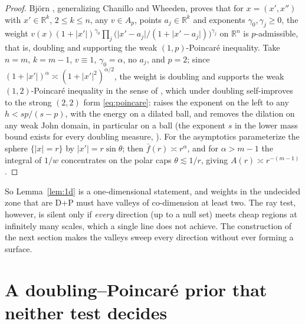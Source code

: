 \documentclass[11pt]{amsart}
\newcommand{\R}{\mathbb{R}}
\newcommand{\abs}[1]{\lvert #1\rvert}
\newcommand{\fbar}{\bar f}
\theoremstyle{plain}
\theoremstyle{definition}
\theoremstyle{remark}
\begin{document}
\begin{proof}
Bj\"orn \cite[Prop.~6]{bjorn2001}, generalizing Chanillo and Wheeden, proves
that for $x=(x',x'')$ with $x'\in\R^k$, $2\le k\le n$, any $v\in A_p$, points
$a_j\in\R^k$ and exponents $\gamma_0,\gamma_j\ge0$, the weight
$v(x)(1+\abs{x'})^{\gamma_0}\prod_j\bigl(\abs{x'-a_j}/(1+\abs{x'-a_j})\bigr)^{\gamma_j}$
on $\R^n$ is $p$-admissible, that is, doubling and supporting the weak
$(1,p)$-Poincar\'e inequality. Take $n=m$, $k=m-1$, $v\equiv1$,
$\gamma_0=\alpha$, no $a_j$, and $p=2$; since $(1+\abs{x'})^\alpha\asymp
(1+\abs{x'}^2)^{\alpha/2}$, the weight is doubling and supports the weak
$(1,2)$-Poincar\'e inequality in the sense of \cite[(5), p.~7]{hajlaszkoskela2000},
which under doubling self-improves to the strong $(2,2)$ form
\eqref{eq:poincare}: \cite[Thm.~5.1]{hajlaszkoskela2000} raises the exponent
on the left to any $h<sp/(s-p)$, with the energy on a dilated ball, and
\cite[Thm.~9.7]{hajlaszkoskela2000} removes the dilation on any weak John
domain, in particular on a ball (the exponent $s$ in the lower mass bound
exists for every doubling measure, \cite[Lemma~14.6]{hajlaszkoskela2000}). For the
asymptotics parameterize the sphere $\{\abs x=r\}$ by $\abs{x'}=r\sin\theta$;
then $\fbar(r)\asymp r^\alpha$, and for $\alpha>m-1$ the integral of $1/w$
concentrates on the polar caps $\theta\lesssim1/r$, giving
$A(r)\asymp r^{-(m-1)}$.
\end{proof}

So Lemma~\ref{lem:1d} is a one-dimensional statement, and weights in the
undecided zone that are D+P must have valleys of co-dimension at least two. The
ray test, however, is silent only if \emph{every} direction (up to a null set)
meets cheap regions at infinitely many scales, which a single line does not
achieve. The construction of the next section makes the valleys sweep every
direction without ever forming a surface.

\section{A doubling--Poincar\'e prior that neither test decides}\label{sec:lattice}
\end{document}

